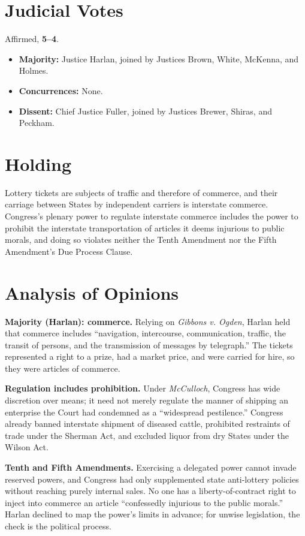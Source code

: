 \documentclass[12pt]{article}
\begin{document}
\section{Judicial Votes}

Affirmed, \textbf{5--4}.
\begin{itemize}
\item \textbf{Majority:} Justice Harlan, joined by Justices Brown, White, McKenna, and Holmes.
\item \textbf{Concurrences:} None.
\item \textbf{Dissent:} Chief Justice Fuller, joined by Justices Brewer, Shiras, and Peckham.
\end{itemize}

\section{Holding}

Lottery tickets are subjects of traffic and therefore of commerce, and their carriage between States by independent carriers is interstate commerce. Congress's plenary power to regulate interstate commerce includes the power to prohibit the interstate transportation of articles it deems injurious to public morals, and doing so violates neither the Tenth Amendment nor the Fifth Amendment's Due Process Clause.

\section{Analysis of Opinions}

\textbf{Majority (Harlan): commerce.} Relying on \textit{Gibbons v. Ogden}, Harlan held that commerce includes ``navigation, intercourse, communication, traffic, the transit of persons, and the transmission of messages by telegraph.'' The tickets represented a right to a prize, had a market price, and were carried for hire, so they were articles of commerce.

\textbf{Regulation includes prohibition.} Under \textit{McCulloch}, Congress has wide discretion over means; it need not merely regulate the manner of shipping an enterprise the Court had condemned as a ``widespread pestilence.'' Congress already banned interstate shipment of diseased cattle, prohibited restraints of trade under the Sherman Act, and excluded liquor from dry States under the Wilson Act.

\textbf{Tenth and Fifth Amendments.} Exercising a delegated power cannot invade reserved powers, and Congress had only supplemented state anti-lottery policies without reaching purely internal sales. No one has a liberty-of-contract right to inject into commerce an article ``confessedly injurious to the public morals.'' Harlan declined to map the power's limits in advance; for unwise legislation, the check is the political process.
\end{document}
